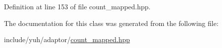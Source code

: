 \-Definition at line 153 of file count\-\_\-mapped.\-hpp.



\-The documentation for this class was generated from the following file\-:\begin{DoxyCompactItemize}
\item 
include/yuh/adaptor/\hyperlink{count__mapped_8hpp}{count\-\_\-mapped.\-hpp}\end{DoxyCompactItemize}
